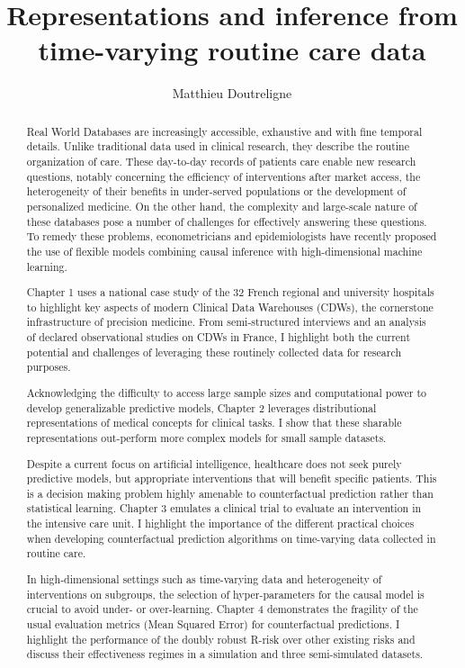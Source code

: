 \documentclass{report}
\title{
  Representations and inference from time-varying routine care data 
}
\author{Matthieu Doutreligne}
\date{}
\begin{document}
\maketitle

\begin{abstract}

  Real World Databases are increasingly accessible, exhaustive and with
  fine temporal details. Unlike traditional data used in clinical research, they
  describe the routine organization of care. These day-to-day records of
  patients care enable new research questions, notably concerning the efficiency
  of interventions after market access, the heterogeneity of their benefits in
  under-served populations or the development of personalized medicine. On the
  other hand, the complexity and large-scale nature of these databases pose a
  number of challenges for effectively answering these questions. To remedy
  these problems, econometricians and epidemiologists have recently proposed
  the use of flexible models combining causal inference with high-dimensional
  machine learning.

  Chapter 1 uses a national case study of the 32 French regional and
  university hospitals to highlight key aspects of modern Clinical Data
  Warehouses (CDWs), the cornerstone infrastructure of precision medicine. From
  semi-structured interviews and an analysis of declared observational studies
  on CDWs in France, I highlight both the current potential and challenges of
  leveraging these routinely collected data for research purposes.

  Acknowledging the difficulty to access large sample sizes and computational
  power to develop generalizable predictive models, Chapter 2 leverages
  distributional representations of medical concepts for clinical tasks. I show
  that these sharable representations out-perform more complex models for
  small sample datasets.

  Despite a current focus on artificial intelligence, healthcare does not seek
  purely predictive models, but appropriate interventions that will benefit
  specific patients. This is a decision making problem highly amenable to
  counterfactual prediction rather than statistical learning. Chapter 3 emulates
  a clinical trial to evaluate an intervention in the intensive care unit. I
  highlight the importance of the different practical choices when developing
  counterfactual prediction algorithms on time-varying data collected in routine
  care.

  In high-dimensional settings such as time-varying data and heterogeneity of
  interventions on subgroups, the selection of hyper-parameters for the causal
  model is crucial to avoid under- or over-learning. Chapter 4 demonstrates the
  fragility of the usual evaluation metrics (Mean Squared Error) for
  counterfactual predictions. I highlight the performance of the doubly robust
  R-risk over other existing risks and discuss their effectiveness regimes in a
  simulation and three semi-simulated datasets.


\end{abstract}
\end{document}
